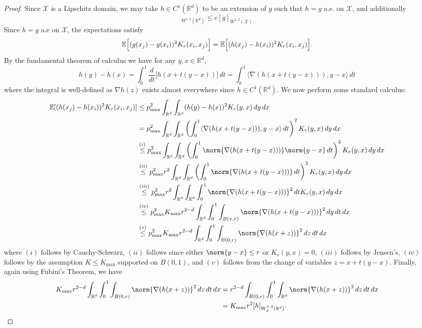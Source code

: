 \documentclass{article}
\newcommand{\Reals}{\mathbb{R}}
\newcommand{\1}{\mathbf{1}}
\newcommand{\Rd}{\Reals^d}
\newcommand{\Xset}{\mathcal{X}}
\newcommand{\Ebb}{\mathbb{E}}
\newcommand{\dotp}[2]{\langle #1, #2 \rangle}
\theoremstyle{alden}
\theoremstyle{aldenthm}
\theoremstyle{definition}
\theoremstyle{remark}
\begin{document}
\begin{proof}
	Since $\Xset$ is a Lipschitz domain, we may take $h \in C^1(\Rd)$ to be an extension of $g$ such that $h = g$ a.e. on $\Xset$, and additionally
	\begin{equation*}
	[h]_{W^{1,2}(\Rd)} \leq c[g]_{W^{1,2}(\Xset)}
	\end{equation*}
	Since $h = g$ a.e on $\Xset$, the expectations satisfy
	\begin{equation*}
	\Ebb\Bigl[(g(x_j) - g(x_i))^2K_r(x_i,x_j)\Bigr] = \Ebb\Bigl[(h(x_j) - h(x_i))^2K_r(x_i,x_j)\Bigr].
	\end{equation*}
	By the fundamental theorem of calculus we have for any $y,x \in \Rd$,
	\begin{equation}
	\label{eqn:expected_first_order_seminorm_pf1}
	h(y) - h(x) = \int_{0}^{1} \frac{d}{dt}\bigl[h(x + t(y - x))\bigr] \,dt = \int_{0}^{1} \dotp{\nabla(h(x + t(y - x)))}{y - x} \,dt
	\end{equation}
	where the integral is well-defined as $\nabla h(z)$ exists almost everywhere since $h \in C^1(\Rd)$. We now perform some standard calculus:
	\begin{align*}
	\Ebb[(h(x_j) - h(x_i))^2K_r(x_i,x_j)] & \leq p_{\max}^2 \int_{\Rd} \int_{\Rd} (h(y) - h(x))^2 K_r(y,x) \,dy \,dx\\
	& = p_{\max}^2 \int_{\Rd} \int_{\Rd} \left(\int_{0}^{1} \dotp{\nabla(h(x + t(y - x)))}{y - x} \,dt\right)^2 K_r(y,x) \,dy \,dx \\
	& \overset{(i)}{\leq} p_{\max}^2 \int_{\Rd} \int_{\Rd} \left(\int_{0}^{1} \norm{\nabla(h(x + t(y - x)))}\norm{y - x} \,dt\right)^2 K_r(y,x) \,dy \,dx \\
	& \overset{(ii)}{\leq} p_{\max}^2 r^2\int_{\Rd} \int_{\Rd} \left(\int_{0}^{1} \norm{\nabla(h(x + t(y - x)))}\,dt\right)^2 K_r(y,x) \,dy \,dx \\
	& \overset{(iii)}{\leq} p_{\max}^2 r^2\int_{\Rd} \int_{\Rd} \int_{0}^{1} \norm{\nabla(h(x + t(y - x)))}^2 \,dt K_r(y,x) \,dy \,dx \\
	& \overset{(iv)}{\leq} p_{\max}^2 K_{\max} r^{2 - d}\int_{\Rd} \int_{0}^{1} \int_{B(x,r)} \norm{\nabla(h(x + t(y - x)))}^2 \,dy \,dt \,dx \\
	& \overset{(v)}{\leq}  p_{\max}^2 K_{\max} r^{2 - d}\int_{\Rd} \int_{0}^{1} \int_{B(0,r)} \norm{\nabla(h(x + z))}^2  \,dz \,dt \,dx
	\end{align*}
	where $(i)$ follows by Cauchy-Schwarz, $(ii)$ follows since either $\norm{y - x} \leq r$ or $K_r(y,x) = 0$, $(iii)$ follows by Jensen's, $(iv)$ follows by the assumption $K \leq K_{\max}$ supported on $B(0,1)$, and $(v)$ follows from the change of variables $z = x + t(y - x)$. Finally, again using Fubini's Theorem, we have
	\begin{align*}
	K_{\max} r^{2 - d}\int_{\Rd} \int_{0}^{1} \int_{B(0,r)} \norm{\nabla(h(x + z))}^2  \,dz \,dt \,dx & = r^{2 - d}\int_{B(0,r)} \int_{0}^{1} \int_{\Rd} \norm{\nabla(h(x + z))}^2  \,dz \,dt \,dx \\
	& = K_{\max} r^2 [h]_{W_d^{1,2}(\Rd)}.
	\end{align*}
\end{proof}
\end{document}
